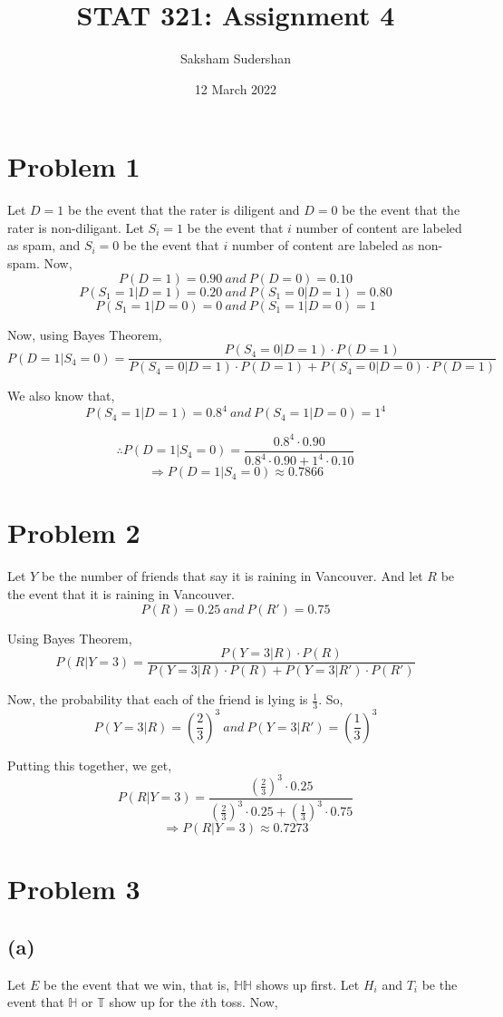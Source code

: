 \documentclass{article}
\title{ STAT 321: Assignment 4}
\author{Saksham Sudershan}
\date{12 March 2022}
\begin{document}
	\maketitle
	\section*{Problem 1}
	Let $D=1$ be the event that the rater is diligent and $D=0$ be the event that the rater is non-diligant. Let $S_i=1$ be the event that $i$ number of content are labeled as spam, and $S_i=0$ be the event that $i$ number of content are labeled as non-spam. Now,
	$$ P(D=1)=0.90\ and\ P(D=0)=0.10 $$
	$$ P(S_1=1|D=1)=0.20\ and\ P(S_1=0|D=1)=0.80 $$
	$$ P(S_1=1|D=0)=0\ and\ P(S_1=1|D=0)=1 $$

	Now, using Bayes Theorem,
	$$ P(D=1|S_4=0)=\frac{P(S_4=0|D=1)\cdot P(D=1)}{P(S_4=0|D=1)\cdot P(D=1)+P(S_4=0|D=0)\cdot P(D=1)} $$


	We also know that,
	$$ P(S_4=1|D=1)=0.8^4\ and\ P(S_4=1|D=0)=1^4$$

	$$ \therefore P(D=1|S_4=0) = \frac{0.8^4 \cdot 0.90}{0.8^4 \cdot 0.90+1^4 \cdot 0.10}$$
	$$ \Rightarrow P(D=1|S_4=0) \approx 0.7866 $$

	\section*{Problem 2}
	Let $Y$ be the number of friends that say it is raining in Vancouver. And let $R$ be the event that it is raining in Vancouver.
	$$ P(R) = 0.25 \ and\ P(R') = 0.75$$
	
	Using Bayes Theorem,
	$$ P(R|Y=3) = \frac{P(Y=3|R) \cdot P(R)}{P(Y=3|R) \cdot P(R) + P(Y=3|R') \cdot P(R')}$$

	Now, the probability that each of the friend is lying is $\frac13$. So,
	$$ P(Y=3|R) = \left( \frac{2}{3}\right)^3 \ and\ P(Y=3|R') = \left( \frac{1}{3} \right)^3$$

	Putting this together, we get,
	$$ P(R|Y=3) = \frac{\left( \frac{2}{3} \right)^3 \cdot0.25}{\left( \frac{2}{3} \right)^3 \cdot0.25 + \left( \frac{1}{3} \right)^3 \cdot 0.75} $$
	$$ \Rightarrow P(R|Y=3) \approx 0.7273 $$

	\section*{Problem 3}
		\subsection*{(a)}
			Let $E$ be the event that we win, that is, $\mathbb{HH}$ shows up first.  Let $H_i$ and $T_i$ be the event that $\mathbb{H}$ or $\mathbb{T}$ show up for the $i$th toss. Now,
\end{document}
